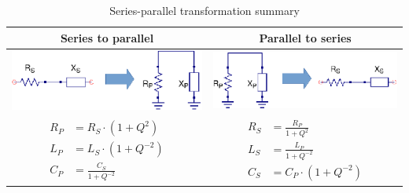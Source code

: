 \begin{table}[H]
  \centering
  \begin{tabular}{ | c | c | }
    \hline
    Series to parallel & Parallel to series\\ \hline
    \begin{minipage}{.4\textwidth}
      \includegraphics[width=\linewidth]{./images/Synthesis/Impedance_Matching/Series_to_parallel}
    \end{minipage}
    &
    \begin{minipage}{.4\textwidth}
      \includegraphics[width=\linewidth]{./images/Synthesis/Impedance_Matching/Parallel_to_series}
    \end{minipage}
    \\ \hline
    \begin{minipage}{.4\textwidth}
         {\begin{align}
           R_P &= R_S \cdot (1 + Q^2)\\
           L_P &= L_S \cdot (1 + Q^{-2})\\
           C_P &= \frac{C_S}{1 + Q^{-2}}
         \end{align}}
    \end{minipage}
    &
        \begin{minipage}{.4\textwidth}
         {\begin{align}
           R_S &= \frac{R_P}{1 + Q^2}\\
           L_S &= \frac{L_P}{1 + Q^{-2}}\\
           C_S &= C_P \cdot (1 + Q^{-2})
         \end{align}}
    \end{minipage}
    \\ \hline
  \end{tabular}
  \caption{Series-parallel transformation summary}
  \label{tbl:Qtrans_summary}
\end{table}

